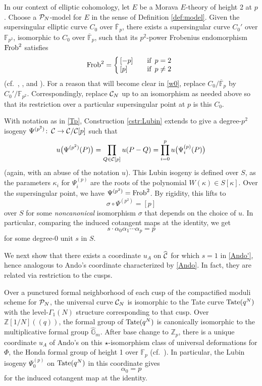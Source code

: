 \documentclass{gtpart}
\theoremstyle{definition}
\theoremstyle{remark}
\def\co{\colon\thinspace}
\newcommand{\mb}[1]{\mathbb{#1}}
\newcommand{\cF}{\overline {\mb F}}
\newcommand{\CC}{{\cal C}}
\newcommand{\CP}{{\cal P}}
\newcommand{\Frob}{{\rm Frob}}
\newcommand{\HGm}{{\widehat{\mb G}_m}}
\newcommand{\BF}{{\mb F}}
\newcommand{\BZ}{{\mb Z}}
\newcommand{\HCC}{\widehat{~\!\!\CC}}
\newcommand{\A}{\alpha}
\newcommand{\G}{\Gamma}
\newcommand{\K}{\kappa}
\newcommand{\lp}{(\!(}
\newcommand{\rp}{)\!)}
\renewcommand{\=}{\approx}
\renewcommand{\-}{\sim}
\newcommand{\Tate}{{\rm Tate}}
\numberwithin{equation}{section}
\begin{document}
In our context of elliptic cohomology, let $E$ be a Morava $E$-theory of height 
2 at $p$.  Choose a $\CP_N$-model for $E$ in the sense of Definition 
\ref{def:model}.  Given the supersingular elliptic curve $C_0$ over $\cF_p$, 
there exists a supersingular curve $C_0'$ over $\BF_{p^2}$, isomorphic to $C_0$ 
over $\cF_p$, such that its $p^2$-power Frobenius endomorphism $\Frob^2$ 
satisfies 
\begin{equation}
 \label{Frob^2}
 \Frob^2 = \left\{\!\!
  \begin{array}{ll}
   {[-p]} & \quad \text{if\, $p = 2$} \\
   {[p]}  & \quad \text{if\, $p \neq 2$} 
  \end{array}
 \right.
\end{equation}
\cite{Poonen} (cf.~\cite[Lemma 3.21]{Poonenetal}, \cite[Remark 3.3]{p3}, and 
\cite[3.8]{mc1}).  For a reason that will become clear in \eqref{w0}, replace 
$C_0 / \cF_p$ by $C_0' / \BF_{p^2}$.  Correspondingly, replace $\CC_N$ up to an 
isomorphism as needed above so that its restriction over a particular 
supersingular point at $p$ is this $C_0$.  

With notation as in \eqref{Tp}, Construction \ref{cstr:Lubin} extends to give a 
degree-$p^2$ isogeny $\Psi^{(p^2)} \co \CC \to \CC/\CC[p]$ such that 
\[
 u\big(\Psi^{(p^2)}(P)\big) = \prod_{Q \in \CC[p]} u(P - Q) 
                            = \prod_{i = 0}^p u\big(\Psi_i^{(p)}(P)\big) 
\]
(again, with an abuse of the notation $u$).  This Lubin isogeny is defined over 
$S$, as the parameters $\K_i$ for $\Psi_i^{(p)}$ are the roots of the polynomial 
$W(\K) \in S[\K]$.  Over the supersingular point, we have 
$\Psi^{(p^2)} = \Frob^2$.  By rigidity, this lifts to 
\[
 \sigma \circ \Psi^{(p^2)} = [p] 
\]
over $S$ for some {\em noncanonical} isomorphism $\sigma$ that depends on the 
choice of $u$.  In particular, comparing the induced cotangent maps at the 
identity, we get 
\begin{equation}
 \label{Ando'}
 s \cdot \A_0 \A_1 \cdots \A_p = p 
\end{equation}
for some degree-0 unit $s$ in $S$.  

We next show that there exists a coordinate $u_A$ on $\HCC$ for which $s = 1$ in 
\eqref{Ando'}, hence analogous to Ando's coordinate characterized by 
\eqref{Ando}.  In fact, they are related via restriction to the cusps.  

Over a punctured formal neighborhood of each cusp of the compactified moduli 
scheme for $\CP_N$, the universal curve $\CC_N$ is isomorphic to the Tate curve 
$\Tate(q^N)$ with the level-$\G_1(N)$ structure corresponding to that cusp.  
Over $\BZ[1/N]\lp q \rp$, the formal group of $\Tate(q^N)$ is canonically 
isomorphic to the multiplicative formal group $\HGm$.  After base change to 
$\BZ_p$, there is a unique coordinate $u_A$ of Ando's on this 
$\star$-isomorphism class of universal deformations for $\Phi$, the Honda formal 
group of height 1 over $\BF_p$ (cf.~\cite[Example 2.7]{Ando95}).  In particular, 
the Lubin isogeny $\Psi_0^{(p)}$ on $\Tate(q^N)$ in this coordinate gives 
\begin{equation}
 \label{A0}
 \A_0 = p 
\end{equation}
for the induced cotangent map at the identity.  
\end{document}
